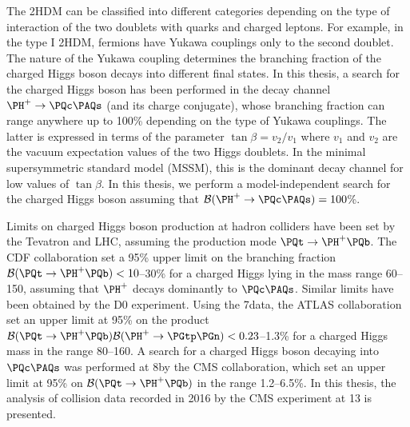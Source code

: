 The 2HDM can be classified into different categories depending on the type of
interaction of the two doublets with quarks and charged leptons. For example,
in the type I 2HDM, fermions have Yukawa couplings only to the second doublet.
The nature of the Yukawa coupling determines the branching fraction of the charged
Higgs boson decays into different final states. In this thesis, a search for the
charged Higgs boson has been performed in the decay channel $\Hp \to \PQc\PAQs$ (and 
its charge conjugate), whose branching fraction 
can range anywhere up to 100\% depending on the type of Yukawa couplings. The 
latter is expressed in terms of the parameter $\tan\beta=v_2/v_1$ where $v_1$ 
and $v_2$ are the vacuum expectation values of the two Higgs doublets. In the 
minimal supersymmetric standard model (MSSM), this is the dominant decay channel 
for low values of $\tan\beta$. In this thesis, we perform a model-independent search for the charged Higgs boson assuming that $\mathcal{B}(\Hp \to \PQc\PAQs) = 100$\%. 

Limits on charged Higgs boson production at hadron colliders have been set by the 
Tevatron and LHC, assuming the production mode $\PQt \to \Hp\PQb$. The CDF 
collaboration set a 95\% \CL upper limit on the branching 
fraction $\mathcal{B}(\PQt \to \Hp\PQb) < 10$--30\% for a charged Higgs lying in 
the mass range 60--150\GeV, assuming that $\Hp$ decays dominantly to $\PQc\PAQs$. 
Similar limits have been obtained by the D0 experiment. 
Using the 7\TeV data, the ATLAS collaboration set an upper limit at 95\% \CL on 
the product $\mathcal{B}(\PQt \to \Hp\PQb) \mathcal{B}(\Hp \to \PGtp\PGn) < 
0.23$--1.3\% for a charged Higgs mass in the range 80--160\GeV. 
A search for a charged Higgs boson decaying into $\PQc\PAQs$ was performed at 
8\TeV by the CMS collaboration, which set an upper limit at 95\% \CL on 
$\mathcal{B}(\PQt \to \Hp\PQb)$ in the range 1.2--6.5\%. In this thesis, 
the analysis of collision data recorded in 2016 by the CMS experiment at 13\TeV
is presented.  


